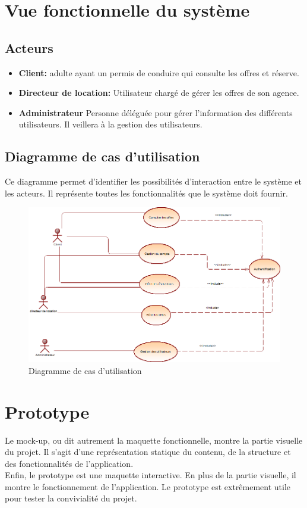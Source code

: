 \documentclass[12pt,a4paper]{report}
\begin{document}
		\section{Vue fonctionnelle du système}
			\subsection{Acteurs}
			\begin{itemize}
				\item \textbf{Client:} adulte ayant un permis de conduire qui consulte les offres et réserve.
				\item \textbf{Directeur de location:} Utilisateur chargé de gérer les offres de son agence.
				\item \textbf{Administrateur} Personne déléguée pour gérer l’information des différents utilisateurs. Il veillera à la gestion des utilisateurs.
			\end{itemize}

			
			\subsection{Diagramme de cas d'utilisation}
Ce diagramme permet d’identifier les possibilités d’interaction entre le système et les acteurs. Il représente toutes les fonctionnalités que le système doit fournir.


			\begin{figure}[!hbtp]
				\centering
				\includegraphics[scale=0.6]{./graphics/usecase.png}
				\caption{Diagramme de cas d'utilisation}
			\end{figure}
			\newpage
		
		\section{Prototype}
Le mock-up, ou dit autrement la maquette fonctionnelle, montre la partie visuelle du projet. Il s’agit d’une représentation statique du contenu, de la structure et des fonctionnalités de l’application.\\
Enfin, le prototype est une maquette interactive. En plus de la partie visuelle, il montre le fonctionnement de l’application. Le prototype est extrêmement utile pour tester la convivialité du projet.\\
\end{document}
